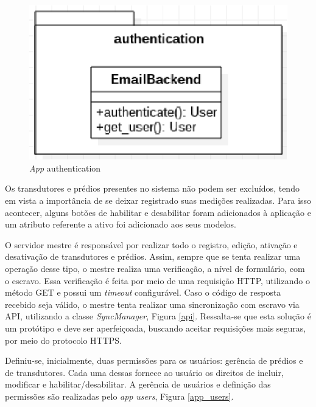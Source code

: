\begin{figure}[!h]
    \centering
    \includegraphics[keepaspectratio=true,scale=0.8]{figuras/authentication.eps}
    \caption{\textit{App} authentication}
    \label{authentication}
\end{figure}

Os transdutores e prédios presentes no sistema não podem ser excluídos, tendo em vista a importância de se deixar registrado suas medições realizadas. Para isso acontecer, alguns botões de habilitar e desabilitar foram adicionados à aplicação e um atributo referente a ativo foi adicionado aos seus modelos.

O servidor mestre é responsável por realizar todo o registro, edição, ativação e desativação de transdutores e prédios. Assim, sempre que se tenta realizar uma operação desse tipo, o mestre realiza uma verificação, a nível de formulário, com o escravo. Essa verificação é feita por meio de uma requisição HTTP, utilizando o método GET e possui um \textit{timeout} configurável. Caso o código de resposta recebido seja válido, o mestre tenta realizar uma sincronização com escravo via API, utilizando a classe \textit{SyncManager}, Figura \ref{api}. Ressalta-se que esta solução é um protótipo e deve ser aperfeiçoada, buscando aceitar requisições mais seguras, por meio do protocolo HTTPS.

Definiu-se, inicialmente, duas permissões para os usuários: gerência de prédios e de transdutores. Cada uma dessas fornece ao usuário os direitos de incluir, modificar e habilitar/desabilitar. A gerência de usuários e definição das permissões são realizadas pelo \textit{app} \textit{users}, Figura \ref{app_users}.


